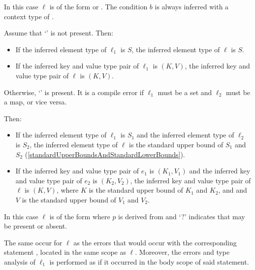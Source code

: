 \documentclass[makeidx]{article}
\begin{document}
{\LMHash{}%
%
In this case $\ell$ is of the form
 or
.
The condition $b$ is always inferred with a context type of .

\LMHash{}%
Assume that `' is not present. Then:
\begin{itemize}
\item
  If the inferred element type of $\ell_1$ is $S$,
  the inferred element type of $\ell$ is $S$.
\item
  If the inferred key and value type pair of $\ell_1$ is $(K, V)$,
  the inferred key and value type pair of $\ell$ is $(K, V)$.
\end{itemize}

\LMHash{}%
Otherwise, `' is present.
It is a compile error if $\ell_1$ must be a set and $\ell_2$ must be a map,
or vice versa.


\LMHash{}%
Then:

\begin{itemize}
\item
  If the inferred element type of $\ell_1$ is $S_1$ and
  the inferred element type of $\ell_2$ is $S_2$,
  the inferred element type of $\ell$ is
  the standard upper bound of $S_1$ and $S_2$
  (\ref{standardUpperBoundsAndStandardLowerBounds}).
\item
  If the inferred key and value type pair of $e_1$ is
  $(K_1, V_1)$
  and the inferred key and value type pair of $e_2$ is
  $(K_2, V_2)$,
  the inferred key and value type pair of $\ell$ is
  $(K, V)$,
  where $K$ is the standard upper bound of $K_1$ and $K_2$, and
  and $V$ is the standard upper bound of $V_1$ and $V_2$.
\end{itemize}
\vspace{-5mm}
\EndCase

\LMHash{}%
%
In this case $\ell$ is of the form
where $p$ is derived from  and
`\AWAIT?' indicates that \AWAIT{} may be present or absent.

\LMHash{}%
The same  occur for $\ell$ as
the errors that would occur with the corresponding \FOR{} statement
,
located in the same scope as $\ell$.
Moreover, the errors and type analysis of $\ell_1$ is performed
as if it occurred in the body scope of said \FOR{} statement.

}
\end{document}
